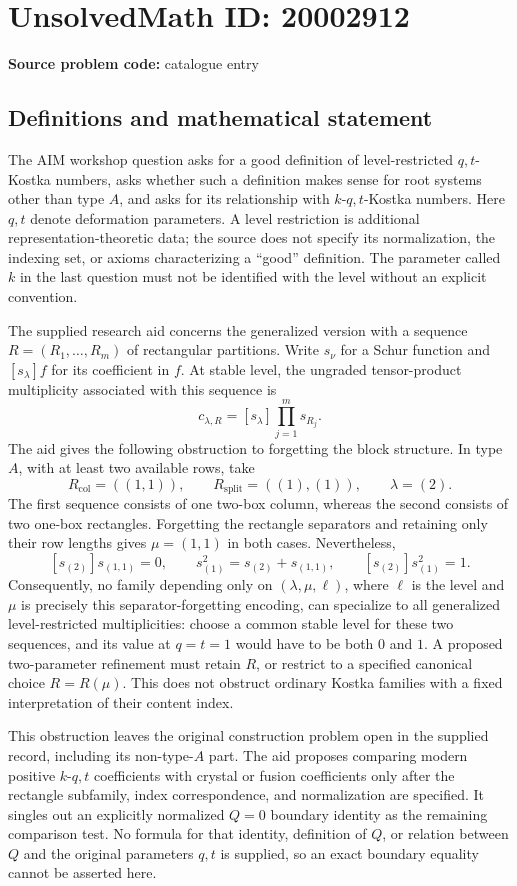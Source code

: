 \documentclass[11pt]{article}
\begin{document}
\section*{UnsolvedMath ID: 20002912}
\textbf{Source problem code:} catalogue entry
\subsection{Definitions and mathematical statement}
The AIM workshop question asks for a good definition of level-restricted $q,t$-Kostka numbers, asks whether such a definition makes sense for root systems other than type $A$, and asks for its relationship with $k$-$q,t$-Kostka numbers. Here $q,t$ denote deformation parameters. A level restriction is additional representation-theoretic data; the source does not specify its normalization, the indexing set, or axioms characterizing a ``good'' definition. The parameter called $k$ in the last question must not be identified with the level without an explicit convention.

The supplied research aid concerns the generalized version with a sequence $R=(R_1,\ldots,R_m)$ of rectangular partitions. Write $s_\nu$ for a Schur function and $[s_\lambda]f$ for its coefficient in $f$. At stable level, the ungraded tensor-product multiplicity associated with this sequence is
\[
 c_{\lambda,R}=[s_\lambda]\prod_{j=1}^m s_{R_j}.
\]
The aid gives the following obstruction to forgetting the block structure. In type $A$, with at least two available rows, take
\[
 R_{\mathrm{col}}=((1,1)),\qquad
 R_{\mathrm{split}}=((1),(1)),\qquad \lambda=(2).
\]
The first sequence consists of one two-box column, whereas the second consists of two one-box rectangles. Forgetting the rectangle separators and retaining only their row lengths gives $\mu=(1,1)$ in both cases. Nevertheless,
\[
 [s_{(2)}]s_{(1,1)}=0,\qquad
 s_{(1)}^2=s_{(2)}+s_{(1,1)},\qquad
 [s_{(2)}]s_{(1)}^2=1.
\]
Consequently, no family depending only on $(\lambda,\mu,\ell)$, where $\ell$ is the level and $\mu$ is precisely this separator-forgetting encoding, can specialize to all generalized level-restricted multiplicities: choose a common stable level for these two sequences, and its value at $q=t=1$ would have to be both $0$ and $1$. A proposed two-parameter refinement must retain $R$, or restrict to a specified canonical choice $R=R(\mu)$. This does not obstruct ordinary Kostka families with a fixed interpretation of their content index.

This obstruction leaves the original construction problem open in the supplied record, including its non-type-$A$ part. The aid proposes comparing modern positive $k$-$q,t$ coefficients with crystal or fusion coefficients only after the rectangle subfamily, index correspondence, and normalization are specified. It singles out an explicitly normalized $Q=0$ boundary identity as the remaining comparison test. No formula for that identity, definition of $Q$, or relation between $Q$ and the original parameters $q,t$ is supplied, so an exact boundary equality cannot be asserted here.
\end{document}
